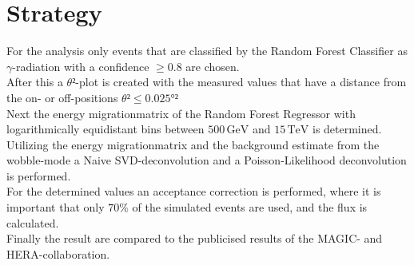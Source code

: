 \section{Strategy}
For the analysis only events that are classified by the Random Forest Classifier as $\gamma$-radiation with a confidence $\geq 0.8$ are chosen. \\
After this a $\theta²$-plot is created with the measured values that have a distance from the on- or off-positions $\theta² \leq 0.025°²$ \\
Next the energy migrationmatrix of the Random Forest Regressor with logarithmically equidistant bins between $500 \, \si{\giga\eV}$ 
and $15 \, \si{\tera\eV}$ is determined. Utilizing the energy migrationmatrix and the background estimate from the wobble-mode 
a Naive SVD-deconvolution and a Poisson-Likelihood deconvolution is performed.\\
For the determined values an acceptance correction is performed, where it is important that only $70 \%$ of the simulated events are used, 
and the flux is calculated.\\
Finally the result are compared to the publicised results of the MAGIC- and HERA-collaboration.
